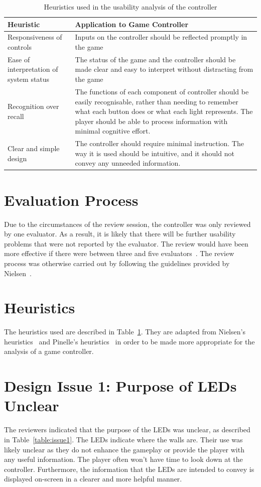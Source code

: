 \documentclass{scrartcl}
\begin{document}
\begin{table}
\centering
\begin{tabular}{| l | p{6cm} |}
\hline
\textbf{Heuristic} & \textbf{Application to Game Controller} \\ \hline
Responsiveness of controls & Inputs on the controller should be reflected promptly in the game \\ \hline
Ease of interpretation of system status & The status of the game and the controller should be made clear and easy to interpret without distracting from the game \\ \hline
Recognition over recall & The functions of each component of controller should be easily recognisable, rather than needing to remember what each button does or what each light represents. The player should be able to process information with minimal cognitive effort.\\ \hline
Clear and simple design & The controller should require minimal instruction. The way it is used should be intuitive, and it should not convey any unneeded information.\\ \hline
\end{tabular}
\caption{Heuristics used in the usability analysis of the controller}
\label{table:heuristics}
\end{table}


\section{Evaluation Process}
Due to the circumstances of the review session, the controller was only reviewed by one evaluator. As a result, it is likely that there will be further usability problems that were not reported by the evaluator. The review would have been more effective if there were between three and five evaluators~\cite{nielsen:evaluation}. The review process was otherwise carried out by following the guidelines provided by Nielsen~\cite{nielsen:how}.

\section{Heuristics}
The heuristics used are described in Table~\ref{table:heuristics}. They are adapted from Nielsen's heuristics~\cite{nielsen:heuristics} and Pinelle's heuristics~\cite{pinelle:heuristic} in order to be made more appropriate for the analysis of a game controller.

\section{Design Issue 1: Purpose of LEDs Unclear}
The reviewers indicated that the purpose of the LEDs was unclear, as described in Table~\ref{table:issue1}. The LEDs indicate where the walls are. Their use was likely unclear as they do not enhance the gameplay or provide the player with any useful information. The player often won't have time to look down at the controller. Furthermore, the information that the LEDs are intended to convey is displayed on-screen in a clearer and more helpful manner.
\end{document}
